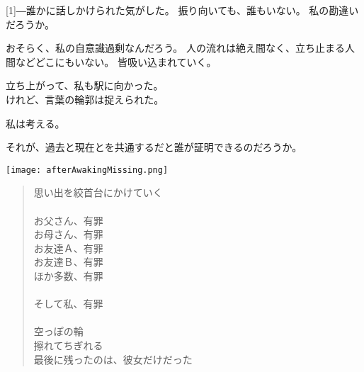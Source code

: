\documentclass[../IHMain]{subfiles}
\begin{document}
\scalebox{3}[1]{―}誰かに話しかけられた気がした。
振り向いても、誰もいない。
私の勘違いだろうか。

おそらく、私の自意識過剰なんだろう。
人の流れは絶え間なく、立ち止まる人間などどこにもいない。
皆吸い込まれていく。

立ち上がって、私も駅に向かった。\\

けれど、言葉の輪郭は捉えられた。

私は考える。

それが、過去と現在とを共通するだと誰が証明できるのだろうか。

\newpage
\onecolumn
\begin{landscape}
\enlargethispage{200truemm}%
\newpage\thispagestyle{empty}%
\vspace*{-1in}%
\vspace*{-\topmargin}%
\vspace*{-\headheight}%
\vspace*{-\headsep}%
\vspace*{-\topskip}%
\noindent\hspace*{-1in}\hspace*{-\oddsidemargin}%
\texttt{[image: afterAwakingMissing.png]}
\end{landscape}
\newpage
\tate
\markboth{}{}
    \begin{verse}
        
    思い出を絞首台にかけていく\\　\\
        
    お父さん、有罪\\
    お母さん、有罪\\
    お友達Ａ、有罪\\
    お友達Ｂ、有罪\\
    ほか多数、有罪\\　\\

    そして私、有罪\\　\\

    空っぽの輪\\
    擦れてちぎれる\\
    最後に残ったのは、彼女だけだった

    \end{verse}
\twocolumn
\end{document}
